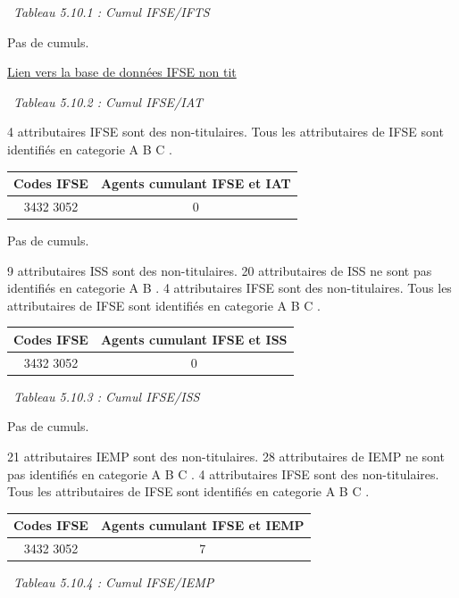 ~\emph{Tableau 5.10.1 : Cumul IFSE/IFTS}

Pas de cumuls.

\href{../Bases/Reglementation/IFSE.non.tit.csv}{Lien vers la base de
données IFSE non tit}

~\emph{Tableau 5.10.2 : Cumul IFSE/IAT}

4 attributaires IFSE sont des non-titulaires. Tous les attributaires de
IFSE sont identifiés en categorie A B C .

\begin{longtable}[]{@{}cc@{}}
\toprule
Codes IFSE & Agents cumulant IFSE et IAT\tabularnewline
\midrule
\endhead
3432 3052 & 0\tabularnewline
\bottomrule
\end{longtable}

Pas de cumuls.

9 attributaires ISS sont des non-titulaires. 20 attributaires de ISS ne
sont pas identifiés en categorie A B . 4 attributaires IFSE sont des
non-titulaires. Tous les attributaires de IFSE sont identifiés en
categorie A B C .

\begin{longtable}[]{@{}cc@{}}
\toprule
Codes IFSE & Agents cumulant IFSE et ISS\tabularnewline
\midrule
\endhead
3432 3052 & 0\tabularnewline
\bottomrule
\end{longtable}

~\emph{Tableau 5.10.3 : Cumul IFSE/ISS}

Pas de cumuls.

21 attributaires IEMP sont des non-titulaires. 28 attributaires de IEMP
ne sont pas identifiés en categorie A B C . 4 attributaires IFSE sont
des non-titulaires. Tous les attributaires de IFSE sont identifiés en
categorie A B C .

\begin{longtable}[]{@{}cc@{}}
\toprule
Codes IFSE & Agents cumulant IFSE et IEMP\tabularnewline
\midrule
\endhead
3432 3052 & 7\tabularnewline
\bottomrule
\end{longtable}

~\emph{Tableau 5.10.4 : Cumul IFSE/IEMP}

